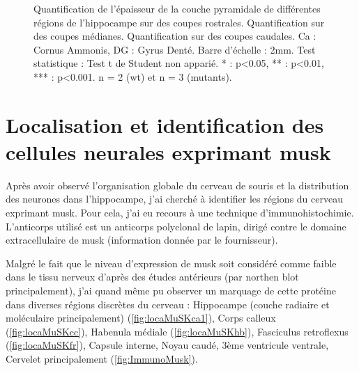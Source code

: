 \begin{figure}[h]
{					 Quantification de l'épaisseur de la couche pyramidale de différentes régions de l'hippocampe sur des coupes rostrales. 
					 Quantification sur des coupes médianes.
					 Quantification sur des coupes caudales.
					Ca : Cornus Ammonis, DG : Gyrus Denté. 
					Barre d'échelle : 2mm. 
					Test statistique : Test t de Student non apparié. 
					* : p<0.05, ** : p<0.01, *** : p<0.001. 
					n = 2 (\acrshort{wt}) et n = 3 (mutants).
					}
			\label{fig:NeuNResultat}
		\end{figure}
	\FloatBarrier
	
\section{Localisation et identification des cellules neurales exprimant \acrshort{musk}}
	\label{ssec:musk}
	Après avoir observé l'organisation globale du cerveau de souris et la distribution des neurones dans l'hippocampe, j'ai cherché à identifier les régions du cerveau exprimant \gls{musk}. Pour cela, j'ai eu recours à une technique d'immunohistochimie. L'anticorps utilisé est un anticorps polyclonal de lapin, dirigé contre le domaine extracellulaire de \gls{musk} (information donnée par le fournisseur).
	
	Malgré le fait que le niveau d'expression de \gls{musk} soit considéré comme faible dans le tissu nerveux d'après des études antérieurs (par northen blot principalement), j'ai quand même pu observer un marquage de cette protéine dans diverses régions discrètes du cerveau : Hippocampe (couche radiaire et moléculaire principalement) (\cref{fig:locaMuSKca1}), Corps calleux (\cref{fig:locaMuSKcc}), Habenula médiale (\cref{fig:locaMuSKhb}), Fasciculus retroflexus (\cref{fig:locaMuSKfr}), Capsule interne, Noyau caudé, 3ème ventricule ventrale, Cervelet principalement (\cref{fig:ImmunoMusk}). 
	
